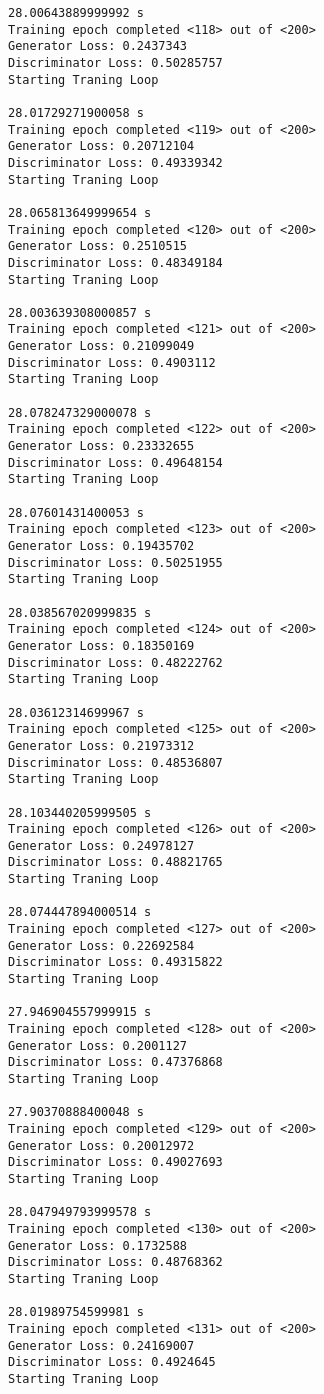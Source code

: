 \documentclass[11pt]{article}
\begin{document}
\begin{Verbatim}[commandchars=\\\{\}]
28.00643889999992 s
Training epoch completed <118> out of <200>
Generator Loss: 0.2437343
Discriminator Loss: 0.50285757
Starting Traning Loop 

28.01729271900058 s
Training epoch completed <119> out of <200>
Generator Loss: 0.20712104
Discriminator Loss: 0.49339342
Starting Traning Loop 

28.065813649999654 s
Training epoch completed <120> out of <200>
Generator Loss: 0.2510515
Discriminator Loss: 0.48349184
Starting Traning Loop 

28.003639308000857 s
Training epoch completed <121> out of <200>
Generator Loss: 0.21099049
Discriminator Loss: 0.4903112
Starting Traning Loop 

28.078247329000078 s
Training epoch completed <122> out of <200>
Generator Loss: 0.23332655
Discriminator Loss: 0.49648154
Starting Traning Loop 

28.07601431400053 s
Training epoch completed <123> out of <200>
Generator Loss: 0.19435702
Discriminator Loss: 0.50251955
Starting Traning Loop 

28.038567020999835 s
Training epoch completed <124> out of <200>
Generator Loss: 0.18350169
Discriminator Loss: 0.48222762
Starting Traning Loop 

28.03612314699967 s
Training epoch completed <125> out of <200>
Generator Loss: 0.21973312
Discriminator Loss: 0.48536807
Starting Traning Loop 

28.103440205999505 s
Training epoch completed <126> out of <200>
Generator Loss: 0.24978127
Discriminator Loss: 0.48821765
Starting Traning Loop 

28.074447894000514 s
Training epoch completed <127> out of <200>
Generator Loss: 0.22692584
Discriminator Loss: 0.49315822
Starting Traning Loop 

27.946904557999915 s
Training epoch completed <128> out of <200>
Generator Loss: 0.2001127
Discriminator Loss: 0.47376868
Starting Traning Loop 

27.90370888400048 s
Training epoch completed <129> out of <200>
Generator Loss: 0.20012972
Discriminator Loss: 0.49027693
Starting Traning Loop 

28.047949793999578 s
Training epoch completed <130> out of <200>
Generator Loss: 0.1732588
Discriminator Loss: 0.48768362
Starting Traning Loop 

28.01989754599981 s
Training epoch completed <131> out of <200>
Generator Loss: 0.24169007
Discriminator Loss: 0.4924645
Starting Traning Loop 


\end{Verbatim}
\end{document}
